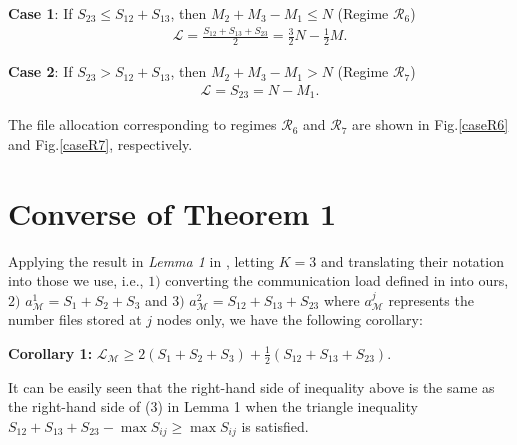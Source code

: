 \documentclass[conference]{IEEEtran}
\begin{document}
{\bf Case 1}: If $S_{23}\!\leq\! S_{12}\!+\!S_{13}$, then $ M_2\!+\!M_3\!-\!M_1\!\leq\! N$ (Regime $\mathcal{R}_6$)
\begin{eqnarray}
{\mathcal L}=\frac{S_{12}+S_{13}+S_{23}}{2}=\frac{3}{2}N-\frac{1}{2}M.
\end{eqnarray}

{\bf Case 2}: If $S_{23}\!>\! S_{12}\!+\!S_{13}$, then $ M_2\!+\!M_3\!-\!M_1\!>\! N$ (Regime $\mathcal{R}_7$)
\begin{eqnarray}
{\mathcal L}=S_{23}=N-M_1.
\end{eqnarray}

The file allocation corresponding to regimes $\mathcal{R}_6$ and $\mathcal{R}_7$ are shown in Fig.\ref{caseR6} and Fig.\ref{caseR7}, respectively.





\section{Converse of Theorem 1}\label{sec:converse}

Applying the result in \emph{Lemma 1} in \cite{Avestimehr_CDC}, letting $K=3$ and translating their notation into those we use, i.e., $1)$ converting the communication load defined in \cite{Avestimehr_CDC} into ours, $2)$ $a^1_{\mathcal{M}}=S_1+S_2+S_3$ and $3)$ $a^2_{\mathcal{M}}=S_{12}+S_{13}+S_{23}$ where $a^j_{\mathcal{M}}$ represents the number files stored at $j$ nodes only, we have the following corollary:

{\bf Corollary 1:} ${\mathcal L}_{\mathcal{M}}\geq 2(S_1+S_2+S_3)+\frac{1}{2}(S_{12}+S_{13}+S_{23})$.

\begin{remark}
It can be easily seen that the right-hand side of inequality above is the same as the right-hand side of (3) in Lemma 1 when the triangle inequality  $S_{12}+S_{13}+S_{23}-\max S_{ij}\geq \max S_{ij}$ is satisfied.
\end{remark}
\end{document}
